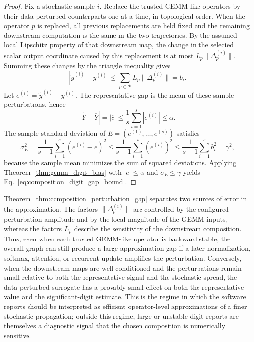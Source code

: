 \documentclass[manuscript, screen]{acmart}
\begin{document}
\begin{proof}
Fix a stochastic sample $i$. Replace the trusted GEMM-like operators by their
data-perturbed counterparts one at a time, in topological order. When the
operator $p$ is replaced, all previous replacements are held fixed and the
remaining downstream computation is the same in the two trajectories. By the
assumed local Lipschitz property of that downstream map, the change in the
selected scalar output coordinate caused by this replacement is at most
$L_p\|\Delta_p^{(i)}\|$. Summing these changes by the triangle inequality gives
\[
|\widetilde{y}^{(i)}-y^{(i)}|
\le
\sum_{p\in\mathcal{P}} L_p\|\Delta_p^{(i)}\|
=b_i.
\]
Let $e^{(i)}=\widetilde{y}^{(i)}-y^{(i)}$. The representative gap is the mean
of these sample perturbations, hence
\[
|\overline{\widetilde{Y}}-\overline{Y}|
=|\overline{e}|
\le \frac{1}{s}\sum_{i=1}^{s}|e^{(i)}|
\le \alpha.
\]
The sample standard deviation of $E=(e^{(1)},\ldots,e^{(s)})$ satisfies
\[
\sigma_E^2
=
\frac{1}{s-1}\sum_{i=1}^{s}(e^{(i)}-\overline{e})^2
\le
\frac{1}{s-1}\sum_{i=1}^{s}(e^{(i)})^2
\le
\frac{1}{s-1}\sum_{i=1}^{s}b_i^2
=\gamma^2,
\]
because the sample mean minimizes the sum of squared deviations. Applying
Theorem~\ref{thm:gemm_digit_bias} with
$|\overline{e}|\le\alpha$ and $\sigma_E\le\gamma$ yields
Eq.~\eqref{eq:composition_digit_gap_bound}.
\end{proof}

Theorem~\ref{thm:composition_perturbation_gap} separates two sources of error
in the approximation. The factors $\|\Delta_p^{(i)}\|$ are controlled by the
configured perturbation amplitude and by the local magnitude of the GEMM
inputs, whereas the factors $L_p$ describe the sensitivity of the downstream
composition. Thus, even when each trusted GEMM-like operator is backward
stable, the overall graph can still produce a large approximation gap if a
later normalization, softmax, attention, or recurrent update amplifies the
perturbation. Conversely, when the downstream maps are well conditioned and
the perturbations remain small relative to both the representative signal and
the stochastic spread, the data-perturbed surrogate has a provably small effect
on both the representative value and the significant-digit estimate. This is
the regime in which the software reports should be interpreted as efficient
operator-level approximations of a finer stochastic propagation; outside this
regime, large or unstable digit reports are themselves a diagnostic signal
that the chosen composition is numerically sensitive.
\end{document}
